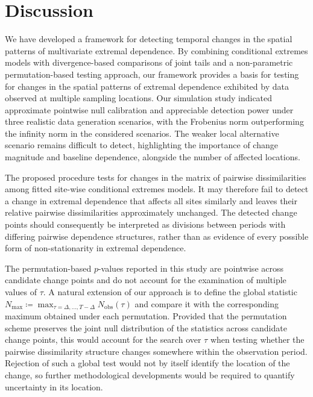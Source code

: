 \documentclass[APA,STIX1COL]{WileyNJD-v2}
\begin{document}
\section{Discussion}
\label{sec:Discussion}

We have developed a framework for detecting temporal changes in the spatial patterns of multivariate extremal dependence. By combining conditional extremes models with divergence-based comparisons of joint tails and a non-parametric permutation-based testing approach, our framework provides a basis for testing for changes in the spatial patterns of extremal dependence exhibited by data observed at multiple sampling locations. Our simulation study indicated approximate pointwise null calibration and appreciable detection power under three realistic data generation scenarios, with the Frobenius norm outperforming the infinity norm in the considered scenarios. The weaker local alternative scenario remains difficult to detect, highlighting the importance of change magnitude and baseline dependence, alongside the number of affected locations.

The proposed procedure tests for changes in the matrix of pairwise dissimilarities among fitted site-wise conditional extremes models. It may therefore fail to detect a change in extremal dependence that affects all sites similarly and leaves their relative pairwise dissimilarities approximately unchanged. The detected change points should consequently be interpreted as divisions between periods with differing pairwise dependence structures, rather than as evidence of every possible form of non-stationarity in extremal dependence.

The permutation-based $p$-values reported in this study are pointwise across candidate change points and do not account for the examination of multiple values of $\tau$. A natural extension of our approach is to define the global statistic $N_{\max}\coloneq\max_{\tau=\Delta,\ldots,T-\Delta}N_{\mathrm{obs}}(\tau)$ and compare it with the corresponding maximum obtained under each permutation. Provided that the permutation scheme preserves the joint null distribution of the statistics across candidate change points, this would account for the search over $\tau$ when testing whether the pairwise dissimilarity structure changes somewhere within the observation period. Rejection of such a global test would not by itself identify the location of the change, so further methodological developments would be required to quantify uncertainty in its location.
\end{document}
